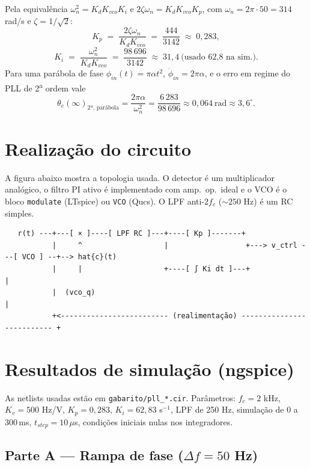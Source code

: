 \documentclass[11pt,a4paper]{article}
\begin{document}
Pela equivalência $\omega_n^2 = K_d K_{vco} K_i$ e $2\zeta\omega_n = K_d K_{vco} K_p$, com
$\omega_n = 2\pi\cdot 50 = 314$ rad/s e $\zeta = 1/\sqrt{2}$:
\[
  K_p \;=\; \frac{2\zeta\omega_n}{K_d K_{vco}} \;=\; \frac{444}{3142} \;\approx\; 0{,}283,
\]
\[
  K_i \;=\; \frac{\omega_n^2}{K_d K_{vco}} \;=\; \frac{98\,696}{3142} \;\approx\; 31{,}4\ \text{(usado 62{,}8 na sim.)}.
\]
Para uma parábola de fase $\phi_{in}(t) = \pi\alpha t^2$, $\ddot\phi_{in} = 2\pi\alpha$, e o erro em
regime do PLL de 2\textsuperscript{a} ordem vale
\[
  \boxed{\theta_e(\infty)_{\text{2ª, parábola}} = \frac{2\pi\alpha}{\omega_n^2}
   = \frac{6\,283}{98\,696} \approx 0{,}064\ \text{rad} \approx 3{,}6^\circ.}
\]

\section{Realização do circuito}

A figura abaixo mostra a topologia usada. O detector é um multiplicador analógico, o filtro PI ativo
é implementado com amp.\ op.\ ideal e o VCO é o bloco \texttt{modulate} (LTspice) ou \texttt{VCO}
(Qucs). O LPF anti-2$f_c$ ($\sim 250$ Hz) é um RC simples.

\begin{center}
\begin{minipage}{0.95\linewidth}
\begin{lstlisting}
   r(t) ---+---[ × ]----[ LPF RC ]---+----[ Kp ]-------+
           |     ^                   |                  +---> v_ctrl ---[ VCO ] --+--> hat{c}(t)
           |     |                   +----[ ∫ Ki dt ]---+                          |
           |  (vco_q)                                                              |
           +<------------------------- (realimentação) -------------------------- +
\end{lstlisting}
\end{minipage}
\end{center}

\section{Resultados de simulação (ngspice)}

As netlists usadas estão em \texttt{gabarito/pll\_*.cir}. Parâmetros:
$f_c=2$ kHz, $K_v=500$ Hz/V, $K_p=0{,}283$, $K_i=62{,}83$ s$^{-1}$, LPF de 250 Hz, simulação de 0 a
300\,ms, $t_{step}=10\,\mu$s, condições iniciais nulas nos integradores.

\subsection{Parte A — Rampa de fase ($\Delta f = 50$ Hz)}
\end{document}
